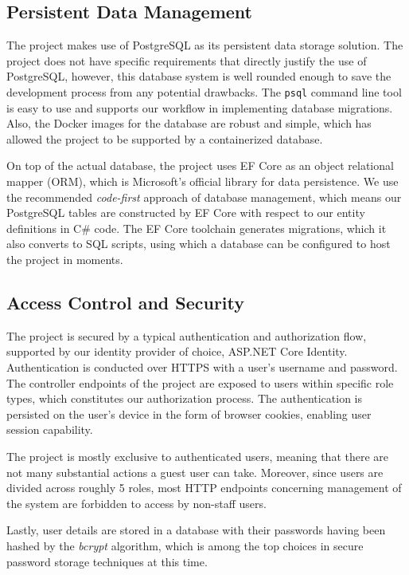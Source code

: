\documentclass[a4paper, 12pt, titlepage]{article}
\begin{document}
  \subsection{Persistent Data Management}

  The project makes use of PostgreSQL as its persistent data storage solution.
  The project does not have specific requirements that directly justify the use of PostgreSQL,
  however, this database system is well rounded enough to save the development process from any potential drawbacks.
  The \texttt{psql} command line tool is easy to use and supports our workflow in implementing database migrations.
  Also, the Docker images for the database are robust and simple,
  which has allowed the project to be supported by a containerized database.

  On top of the actual database, the project uses EF Core as an object relational mapper (ORM),
  which is Microsoft's official library for data persistence.
  We use the recommended \textit{code-first} approach of database management, which means our PostgreSQL tables are
  constructed by EF Core with respect to our entity definitions in C\# code.
  The EF Core toolchain generates migrations, which it also converts to SQL scripts,
  using which a database can be configured to host the project in moments.

  \subsection{Access Control and Security}

  The project is secured by a typical authentication and authorization flow,
  supported by our identity provider of choice, ASP.NET Core Identity.
  Authentication is conducted over HTTPS with a user's username and password.
  The controller endpoints of the project are exposed to users within specific role types,
  which constitutes our authorization process.
  The authentication is persisted on the user's device in the form of browser cookies, enabling user session capability.

  The project is mostly exclusive to authenticated users, meaning that there are not many substantial actions a guest user can take.
  Moreover, since users are divided across roughly 5 roles,
  most HTTP endpoints concerning management of the system are forbidden to access by non-staff users.

  Lastly, user details are stored in a database with their passwords having been hashed by the \textit{bcrypt} algorithm,
  which is among the top choices in secure password storage techniques at this time.
\end{document}
